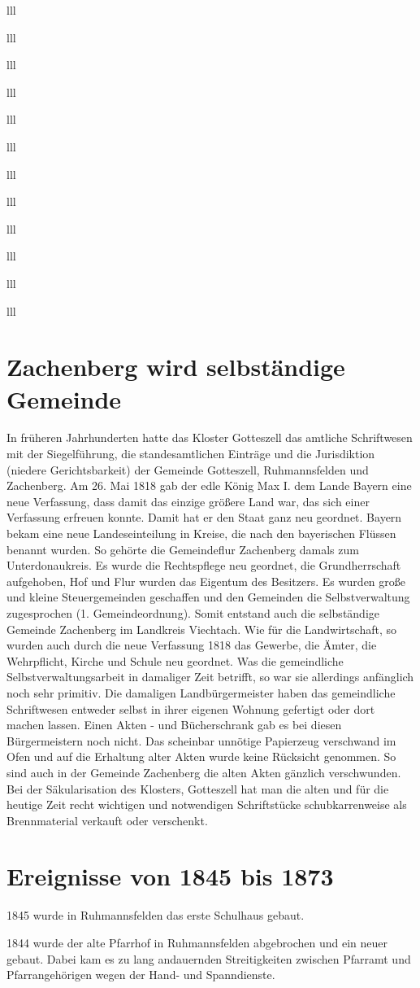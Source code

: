 \documentclass[12pt,a4pager]{book}
\begin{document}
\begin{tabuluar}{lll}
\begin{tabuluar}{lll}
\begin{tabuluar}{lll}
\begin{tabuluar}{lll}
\begin{tabuluar}{lll}
\begin{tabuluar}{lll}
\begin{tabuluar}{lll}
\begin{tabuluar}{lll}
\begin{tabuluar}{lll}
\begin{tabuluar}{lll}
\begin{tabuluar}{lll}
\begin{tabuluar}{lll}
\section{Zachenberg wird selbständige Gemeinde}

In früheren Jahrhunderten hatte das Kloster Gotteszell das amtliche Schriftwesen
mit der Siegelführung, die standesamtlichen Einträge und die Jurisdiktion
(niedere Gerichtsbarkeit) der Gemeinde Gotteszell, Ruhmannsfelden und
Zachenberg. Am 26. Mai 1818 gab der edle König Max I. dem Lande Bayern eine neue
Verfassung, dass damit das einzige größere Land war, das sich einer Verfassung
erfreuen konnte. Damit hat er den Staat ganz neu geordnet. Bayern bekam eine
neue Landeseinteilung in Kreise, die nach den bayerischen Flüssen benannt
wurden. So gehörte die Gemeindeflur Zachenberg damals zum Unterdonaukreis. Es
wurde die Rechtspflege neu geordnet, die Grundherrschaft aufgehoben, Hof und
Flur wurden das Eigentum des Besitzers. Es wurden große und kleine
Steuergemeinden geschaffen und den Gemeinden die Selbstverwaltung zugesprochen
(1. Gemeindeordnung). Somit entstand auch die selbständige Gemeinde Zachenberg
im Landkreis Viechtach. Wie für die Landwirtschaft, so wurden auch durch die
neue Verfassung 1818 das Gewerbe, die Ämter, die Wehrpflicht, Kirche und Schule
neu geordnet. Was die gemeindliche Selbstverwaltungsarbeit in damaliger Zeit
betrifft, so war sie allerdings anfänglich noch sehr primitiv. Die damaligen
Landbürgermeister haben das gemeindliche Schriftwesen entweder selbst in ihrer
eigenen Wohnung gefertigt oder dort machen lassen. Einen Akten - und
Bücherschrank gab es bei diesen Bürgermeistern noch nicht. Das scheinbar
unnötige Papierzeug verschwand im Ofen und auf die Erhaltung alter Akten wurde
keine Rücksicht genommen. So sind auch in der Gemeinde Zachenberg die alten
Akten gänzlich verschwunden. Bei der Säkularisation des Klosters, Gotteszell hat
man die alten und für die heutige Zeit recht wichtigen und notwendigen
Schriftstücke schubkarrenweise als Brennmaterial verkauft oder verschenkt.

\section{Ereignisse von 1845 bis 1873}

1845 wurde in Ruhmannsfelden das erste Schulhaus gebaut.

1844 wurde der alte Pfarrhof in Ruhmannsfelden abgebrochen und ein neuer gebaut.
Dabei kam es zu lang andauernden Streitigkeiten zwischen Pfarramt und
Pfarrangehörigen wegen der Hand- und Spanndienste.


\end{tabuluar}
\end{tabuluar}
\end{tabuluar}
\end{tabuluar}
\end{tabuluar}
\end{tabuluar}
\end{tabuluar}
\end{tabuluar}
\end{tabuluar}
\end{tabuluar}
\end{tabuluar}
\end{tabuluar}
\end{document}
